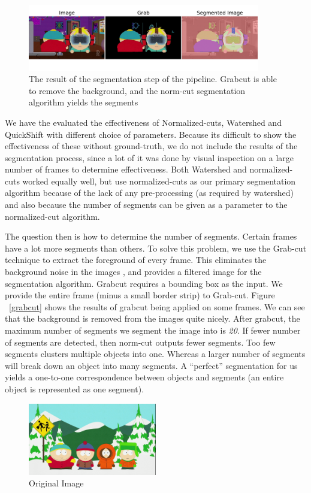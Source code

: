 \documentclass[10pt,twocolumn,letterpaper]{article}
\begin{document}
\begin{figure}[ht]
  \centering
  \includegraphics[width=0.9\textwidth]{../seg2.pdf}
  \caption{The result of the segmentation step of the
    pipeline. Grabcut is able to remove the background, and the
    norm-cut segmentation algorithm yields the segments}
  \label{diff-segmentations}
\end{figure}

We have the evaluated the effectiveness of Normalized-cuts, Watershed
and QuickShift with different choice of parameters. Because its
difficult to show the effectiveness of these without ground-truth, we
do not include the results of the segmentation process, since a lot of
it was done by visual inspection on a large number of frames to
determine effectiveness.  Both Watershed and normalized-cuts worked
equally well, but use normalized-cuts as our primary segmentation
algorithm because of the lack of any pre-processing (as required by
watershed) and also because the number of segments can be given as a
parameter to the normalized-cut algorithm. 

The question then is how to determine the number of segments. Certain
frames have a lot more segments than others. To solve this problem, we
use the Grab-cut technique to extract the foreground of every
frame. This eliminates the background noise in the images , and
provides a filtered image for the segmentation algorithm. Grabcut
requires a bounding box as the input. We provide the entire frame
(minus a small border strip) to Grab-cut. Figure ~\ref{grabcut} shows
the results of grabcut being applied on some frames. We can see that
the background is removed from the images quite nicely. After grabcut,
the maximum number of segments we segment the image into is
\emph{20}. If fewer number of segments are detected, then norm-cut
outputs fewer segments. Too few segments clusters multiple objects
into one. Whereas a larger number of segments will break down an
object into many segments. A ``perfect'' segmentation for us yields a
one-to-one correspondence between objects and segments (an entire
object is represented as one segment). 

\begin{figure}[H]
  \centering
  \includegraphics[width=0.5\textwidth]{../results/southpark.png}
  \caption{Original Image}
  \label{orig-image}
\end{figure}
\end{document}
